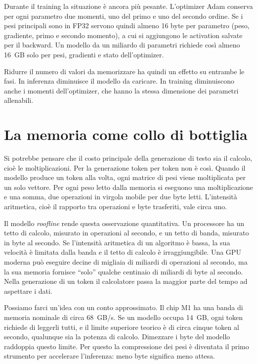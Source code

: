 Durante il training la situazione è ancora più pesante. L'optimizer Adam \cite{kingma2015adam} conserva per ogni parametro due momenti, uno del primo e uno del secondo ordine. Se i pesi principali sono in FP32 servono quindi almeno 16 byte per parametro (peso, gradiente, primo e secondo momento), a cui si aggiungono le activation salvate per il backward. Un modello da un miliardo di parametri richiede così almeno 16~GB solo per pesi, gradienti e stato dell'optimizer.

Ridurre il numero di valori da memorizzare ha quindi un effetto su entrambe le fasi. In inferenza diminuisce il modello da caricare. In training diminuiscono anche i momenti dell'optimizer, che hanno la stessa dimensione dei parametri allenabili.

\section{La memoria come collo di bottiglia}
\label{sec:memory-bound}

Si potrebbe pensare che il costo principale della generazione di testo sia il calcolo, cioè le moltiplicazioni. Per la generazione token per token non è così. Quando il modello produce un token alla volta, ogni matrice di pesi viene moltiplicata per un solo vettore. Per ogni peso letto dalla memoria si eseguono una moltiplicazione e una somma, due operazioni in virgola mobile per due byte letti. L'intensità aritmetica, cioè il rapporto tra operazioni e byte trasferiti, vale circa uno.

Il modello \emph{roofline} \cite{williams2009roofline} rende questa osservazione quantitativa. Un processore ha un tetto di calcolo, misurato in operazioni al secondo, e un tetto di banda, misurato in byte al secondo. Se l'intensità aritmetica di un algoritmo è bassa, la sua velocità è limitata dalla banda e il tetto di calcolo è irraggiungibile. Una GPU moderna può eseguire decine di migliaia di miliardi di operazioni al secondo, ma la sua memoria fornisce ``solo'' qualche centinaio di miliardi di byte al secondo. Nella generazione di un token il calcolatore passa la maggior parte del tempo ad aspettare i dati.

Possiamo farci un'idea con un conto approssimato. Il chip M1 ha una banda di memoria nominale di circa 68~GB/s. Se un modello occupa 14~GB, ogni token richiede di leggerli tutti, e il limite superiore teorico è di circa cinque token al secondo, qualunque sia la potenza di calcolo. Dimezzare i byte del modello raddoppia questo limite. Per questo la compressione dei pesi è diventata il primo strumento per accelerare l'inferenza: meno byte significa meno attesa.

